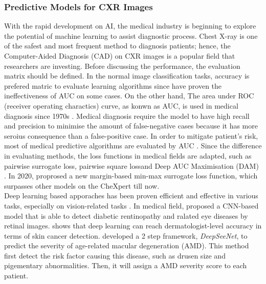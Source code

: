 \subsubsection{Predictive Models for CXR Images}

With the rapid development on AI, the medical industry is beginning to explore the potential of machine learning to assist diagnostic  process. Chest X-ray is one of the safest and most frequent method to diagnosis patients; hence, the Computer-Aided Diagnosis (CAD) on CXR images is a popular field that researchers are investing. Before discussing the performance, the evaluation matrix should be defined. In the normal image classification tasks, accuracy is prefered matric to evaluate learning algorithms since \citep{Lobo2008AUDIsWrong} have proven the ineffectiveness of AUC on some cases. On the other hand, The area under ROC (receiver operating charactics) curve, as konwn as AUC, is used in medical diagnosis since 1970s \citep{Huang2005AUC}. Medical diagnosis require the model to have high recall and precision to minimise the amount of false-negative cases because it has more seroius consequence than a false-positive case. In order to mitigate patient's risk, most of medical predictive algorithms are evaluated by AUC \citep{HajianTilaki2013AUDOnMedical}. Since the difference in evaluating methods, the loss functions in medical fields are adapted, such as pairwise surrogate loss\citep{Gao2012SSurrogatelossAUC}, pairwise square loss\citep{Gao2013AUCSquareLoss}and Deep AUC Maximisation (DAM) \citep{Sulam2017MaximizingAUD}. In 2020, \citet{Yuan2020DAM} proprosed a new margin-based min-max surrogate loss function, which surpasses other models on the CheXpert\citep{Irvin2019Chexpert} till now. \\

Deep learning based apporaches has been proven efficient and effective in various tasks, especially on vision-related tasks \citep{Singh2020ExplainableMedicalImage}. In medical field, \citep{Ting2017DLOnEyeDisease} proposed a CNN-based model that is able to detect diabetic rentinopathy and ralated eye diseases by retinal images. \citet{Esteva2017DNNSkinCancer} shows that deep learning can reach dermatologist-level accuracy in terms of skin cancer detection. \citet{Peng2019DeepSeeNet} developed a 2 step framework, \textit{DeepSeeNet}, to predict the severity of age-related macular degeneration (AMD). This method first detect the risk factor causing this disease, such as drusen size and pigementary abnormalities. Then, it will assign a AMD severity score to each patient.

